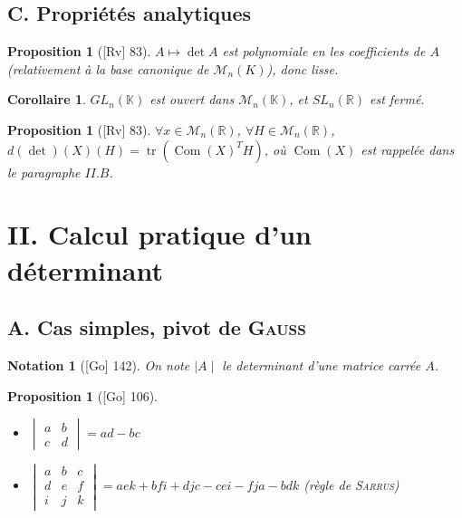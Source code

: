 \documentclass[10pt, a4paper, parskip=full, twoside, twocolumn]{report}
\newtheorem{proposition}[definition]{Proposition}
\newtheorem{corollary}[definition]{Corollaire}
\newtheorem{notation}[definition]{Notation}
\newcommand{\IK}{\mathbb{K}}
\newcommand{\IR}{\mathbb{R}}
\newcommand{\M}{\mathcal{M}}
\DeclareMathOperator{\tr}{tr}
\DeclareMathOperator{\Com}{Com}
\begin{document}
\subsection*{C. Propriétés analytiques}
\begin{proposition}[\textnormal{[Rv] 83}]
	$A\mapsto \det A$ est polynomiale en les coefficients de $A$ (relativement à la base canonique de $\M_n(K)$), donc lisse.
\end{proposition}

\begin{corollary}
	$GL_n(\IK)$ est ouvert dans $\M_n(\IK)$, et $SL_n(\IR)$ est fermé.
\end{corollary}

\begin{proposition}[\textnormal{[Rv] 83}]
	$\forall x\in \M_n(\IR)$, $\forall H\in \M_n(\IR)$, $d(\det)(X)(H) = \tr (\Com(X)^T H)$,
	où $\Com(X)$ est rappelée dans le paragraphe $II. B$.
\end{proposition}

\section*{II. Calcul pratique d'un déterminant}
\subsection*{A. Cas simples, pivot de \textsc{Gauss}}

\begin{notation}[\textnormal{[Go] 142}]
	On note $\mid A\mid$ le determinant d'une matrice carrée $A$.
\end{notation}

\begin{proposition}[\textnormal{[Go] 106}]
	\begin{itemize}
		\item $\begin{vmatrix}
			a & b \\ c & d
		\end{vmatrix} = ad - bc$
		\item $\begin{vmatrix}
			a & b & c \\ d & e & f \\ i & j & k
		\end{vmatrix} = aek+bfi+djc -cei-fja-bdk$ (règle de \textsc{Sarrus})
	\end{itemize}	
\end{proposition}
\end{document}
